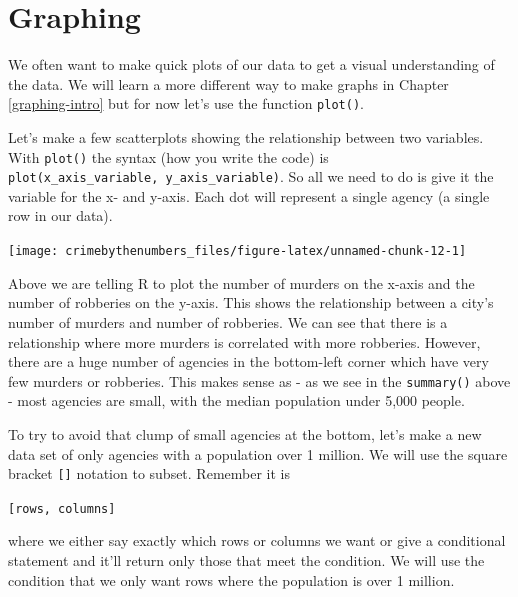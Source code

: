 \documentclass[
  12pt,
]{book}
\newenvironment{Shaded}{\begin{snugshade}}{\end{snugshade}}
\newcommand{\KeywordTok}[1]{\textcolor[rgb]{0.27,0.27,0.27}{\textbf{#1}}}
\newcommand{\NormalTok}[1]{#1}
\newcommand{\OperatorTok}[1]{\textcolor[rgb]{0.43,0.43,0.43}{\textbf{#1}}}
\begin{document}
\hypertarget{graphing}{%
\section{Graphing}\label{graphing}}

We often want to make quick plots of our data to get a visual understanding of the data. We will learn a more different way to make graphs in Chapter \ref{graphing-intro} but for now let's use the function \texttt{plot()}.

Let's make a few scatterplots showing the relationship between two variables. With \texttt{plot()} the syntax (how you write the code) is \texttt{plot(x\_axis\_variable,\ y\_axis\_variable)}. So all we need to do is give it the variable for the x- and y-axis. Each dot will represent a single agency (a single row in our data).

\begin{Shaded}
\end{Shaded}

\begin{center}\texttt{[image: crimebythenumbers\_files/figure-latex/unnamed-chunk-12-1]} \end{center}

Above we are telling R to plot the number of murders on the x-axis and the number of robberies on the y-axis. This shows the relationship between a city's number of murders and number of robberies. We can see that there is a relationship where more murders is correlated with more robberies. However, there are a huge number of agencies in the bottom-left corner which have very few murders or robberies. This makes sense as - as we see in the \texttt{summary()} above - most agencies are small, with the median population under 5,000 people.

To try to avoid that clump of small agencies at the bottom, let's make a new data set of only agencies with a population over 1 million. We will use the square bracket \texttt{{[}{]}} notation to subset. Remember it is

\texttt{{[}rows,\ columns{]}}

where we either say exactly which rows or columns we want or give a conditional statement and it'll return only those that meet the condition. We will use the condition that we only want rows where the population is over 1 million.
\end{document}
